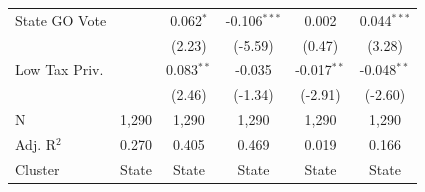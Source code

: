 \begin{tabular*}{\textwidth}{@{\extracolsep{\fill}}lccccc}
   State GO Vote        &                & 0.062$^{*}$    & -0.106$^{***}$ & 0.002          & 0.044$^{***}$\\   
                        &                & (2.23)        & (-5.59)       & (0.47)        & (3.28)\\   
   Low Tax Priv.        &                & 0.083$^{**}$   & -0.035         & -0.017$^{**}$  & -0.048$^{**}$\\   
                        &                & (2.46)        & (-1.34)       & (-2.91)       & (-2.60)\\   
   \hline
   N         & 1,290          & 1,290          & 1,290          & 1,290          & 1,290\\  
   Adj. R$^2$       & 0.270          & 0.405          & 0.469          & 0.019          & 0.166\\  
   Cluster              & State & State & State & State & State\\  
   \bottomrule
\end{tabular*}
\par\endgroup
